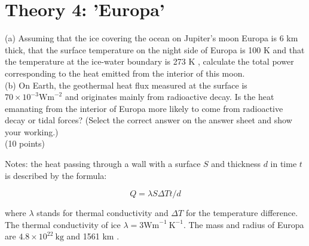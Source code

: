 \documentclass[10pt]{article}
\begin{document}
\section*{Theory 4: 'Europa'}
(a) Assuming that the ice covering the ocean on Jupiter's moon Europa is 6 km thick, that the surface temperature on the night side of Europa is 100 K and that the temperature at the ice-water boundary is 273 K , calculate the total power corresponding to the heat emitted from the interior of this moon.\\
(b) On Earth, the geothermal heat flux measured at the surface is $70 \times 10^{-3} \mathrm{Wm}^{-2}$ and originates mainly from radioactive decay. Is the heat emanating from the interior of Europa more likely to come from radioactive decay or tidal forces? (Select the correct answer on the answer sheet and show your working.)\\
(10 points)

Notes: the heat passing through a wall with a surface $S$ and thickness $d$ in time $t$ is described by the formula:

$$
Q=\lambda S \Delta T t / d
$$

where $\lambda$ stands for thermal conductivity and $\Delta T$ for the temperature difference.\\
The thermal conductivity of ice $\lambda=3 \mathrm{Wm}^{-1} \mathrm{~K}^{-1}$. The mass and radius of Europa are $4.8 \times 10^{22} \mathrm{~kg}$ and 1561 km .
\end{document}
